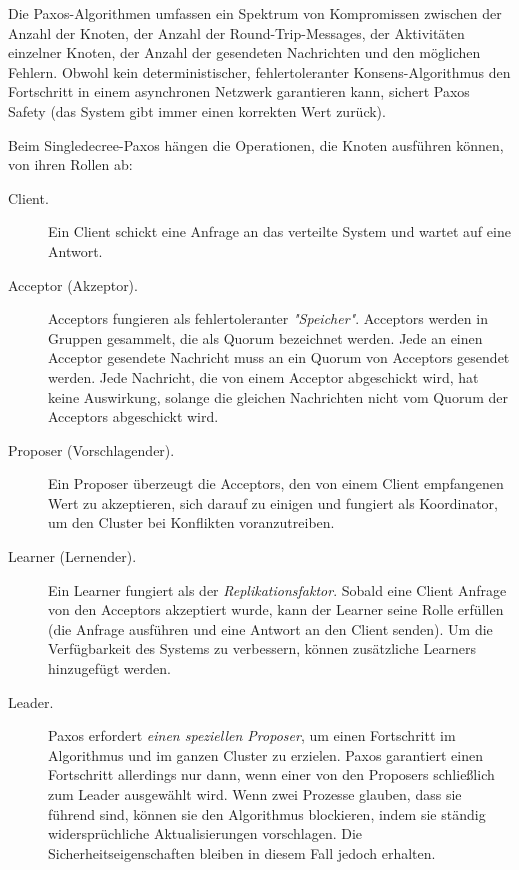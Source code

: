Die Paxos-Algorithmen \cite{Lamport2001paxos-made-simple} umfassen ein Spektrum von Kompromissen zwischen der Anzahl der Knoten, der Anzahl der Round-Trip-Messages, der Aktivitäten einzelner Knoten, der Anzahl der gesendeten Nachrichten und den möglichen Fehlern. Obwohl kein deterministischer, fehlertoleranter Konsens-Algorithmus den Fortschritt in einem asynchronen Netzwerk garantieren kann, sichert Paxos Safety (das System gibt immer einen korrekten Wert zurück).

Beim Singledecree-Paxos \cite{Renesse15paxosmade} hängen die Operationen, die Knoten ausführen können, von ihren Rollen ab:

\begin{description} 
	\item[Client.] Ein Client schickt eine Anfrage an das verteilte System und wartet auf eine Antwort.
	
	\item[Acceptor (Akzeptor).] Acceptors fungieren als fehlertoleranter \textit{"Speicher"}. Acceptors werden in Gruppen gesammelt, die als Quorum bezeichnet werden. Jede an einen Acceptor gesendete Nachricht muss an ein Quorum von Acceptors gesendet werden. Jede Nachricht, die von einem Acceptor abgeschickt wird, hat keine Auswirkung, solange die gleichen Nachrichten nicht vom Quorum der Acceptors abgeschickt wird.
	
	\item[Proposer (Vorschlagender).] Ein Proposer überzeugt die Acceptors, den von einem Client empfangenen Wert zu akzeptieren, sich darauf zu einigen und fungiert als Koordinator, um den Cluster bei Konflikten voranzutreiben.
	
	\item[Learner (Lernender).] Ein Learner fungiert als der \textit{Replikationsfaktor}. Sobald eine Client Anfrage von den Acceptors akzeptiert wurde, kann der Learner seine Rolle erfüllen (die Anfrage ausführen und eine Antwort an den Client senden). Um die Verfügbarkeit des Systems zu verbessern, können zusätzliche Learners hinzugefügt werden.
	
	\item[Leader.] Paxos erfordert \textit{einen speziellen Proposer}, um einen Fortschritt im Algorithmus und im ganzen Cluster zu erzielen. Paxos garantiert einen Fortschritt allerdings nur dann, wenn einer von den Proposers schließlich zum Leader ausgewählt wird. Wenn zwei Prozesse glauben, dass sie führend sind, können sie den Algorithmus blockieren, indem sie ständig widersprüchliche Aktualisierungen vorschlagen. Die Sicherheitseigenschaften bleiben in diesem Fall jedoch erhalten.
\end{description}

